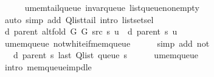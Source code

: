 \begin{isabellebody}
\ \ \ \ \isamarkupfalse%
\ u{\isacharunderscore}{\kern0pt}mem{\isacharunderscore}{\kern0pt}tail{\isacharunderscore}{\kern0pt}queue\ invar{\isacharunderscore}{\kern0pt}queue\ list{\isacharunderscore}{\kern0pt}queue{\isacharunderscore}{\kern0pt}non{\isacharunderscore}{\kern0pt}empty\isanewline
\ \ \ \ \isamarkupfalse%
\ {\isacharparenleft}{\kern0pt}auto\ simp\ add{\isacharcolon}{\kern0pt}\ Q{\isachardot}{\kern0pt}list{\isacharunderscore}{\kern0pt}tail\ intro{\isacharcolon}{\kern0pt}\ list{\isachardot}{\kern0pt}set{\isacharunderscore}{\kern0pt}sel{\isacharparenleft}{\kern0pt}{}{\isacharparenright}{\kern0pt}{\isacharparenright}{\kern0pt}\isanewline
\ \ \isamarkupfalse%
\ {\isachardoublequoteopen}d\ {\isacharparenleft}{\kern0pt}parent\ {\isacharparenleft}{\kern0pt}alt{\isacharunderscore}{\kern0pt}fold\ G{}\ G{}\ src\ s{\isacharparenright}{\kern0pt}{\isacharparenright}{\kern0pt}\ u\ {\isacharequal}{\kern0pt}\ d\ {\isacharparenleft}{\kern0pt}parent\ s{\isacharparenright}{\kern0pt}\ u{\isachardoublequoteclose}\isanewline
\ \ \ \ \isamarkupfalse%
\ u{\isacharunderscore}{\kern0pt}mem{\isacharunderscore}{\kern0pt}queue\ not{\isacharunderscore}{\kern0pt}white{\isacharunderscore}{\kern0pt}if{\isacharunderscore}{\kern0pt}mem{\isacharunderscore}{\kern0pt}queue\isanewline
\ \ \ \ \isamarkupfalse%
\ {\isacharparenleft}{\kern0pt}simp\ add{\isacharcolon}{\kern0pt}\ not{\isacharunderscore}{\kern0pt}{\isacharparenleft}{\kern0pt}{}{\isacharparenright}{\kern0pt}{\isacharparenright}{\kern0pt}\isanewline
\ \ \isamarkupfalse%
\ \isamarkupfalse%
\ {\isachardoublequoteopen}{\isachardot}{\kern0pt}{\isachardot}{\kern0pt}{\isachardot}{\kern0pt}\ {\isasymle}\ d\ {\isacharparenleft}{\kern0pt}parent\ s{\isacharparenright}{\kern0pt}\ {\isacharparenleft}{\kern0pt}last\ {\isacharparenleft}{\kern0pt}Q{\isacharunderscore}{\kern0pt}list\ {\isacharparenleft}{\kern0pt}queue\ s{\isacharparenright}{\kern0pt}{\isacharparenright}{\kern0pt}{\isacharparenright}{\kern0pt}{\isachardoublequoteclose}\isanewline
\ \ \ \ \isamarkupfalse%
\ u{\isacharunderscore}{\kern0pt}mem{\isacharunderscore}{\kern0pt}queue\isanewline
\ \ \ \ \isamarkupfalse%
\ {\isacharparenleft}{\kern0pt}intro\ mem{\isacharunderscore}{\kern0pt}queue{\isacharunderscore}{\kern0pt}imp{\isacharunderscore}{\kern0pt}d{\isacharunderscore}{\kern0pt}le{\isacharparenright}{\kern0pt}\isanewline
\ \ \isamarkupfalse%
\ \isamarkupfalse%

\end{isabellebody}
